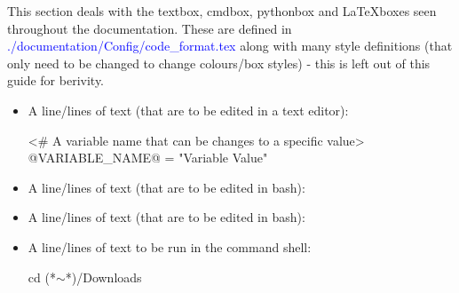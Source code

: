 This section deals with the textbox, cmdbox, pythonbox and \LaTeX boxes seen throughout the documentation. These are defined in \textcolor{blue}{./documentation/Config/code\_format.tex} along with many style definitions (that only need to be changed to change colours/box styles) - this is left out of this guide for berivity.

\begin{itemize}


\item \begin{minipage}[t]{\textwidth} 
A line/lines of text (that are to be edited in a text editor):
\begin{latexbox}
\begin{textbox}
<# A variable name that can be changes to a specific value>
@VARIABLE_NAME@ = "Variable Value"
\end{textbox}
\end{latexbox}
\end{minipage}


\item \begin{minipage}[t]{\textwidth} 
A line/lines of text (that are to be edited in bash):
\begin{latexbox}
\end{latexbox}
\end{minipage}


\item \begin{minipage}[t]{\textwidth}
A line/lines of text (that are to be edited in bash):
\begin{latexbox}
\end{latexbox}
\end{minipage}


\item \begin{minipage}[t]{\textwidth} 
A line/lines of text to be run in the command shell:
\begin{latexbox}
\begin{cmdbox}
cd (*$\sim$*)/Downloads
\end{cmdbox}
\end{latexbox}
\end{minipage}



\end{itemize}
